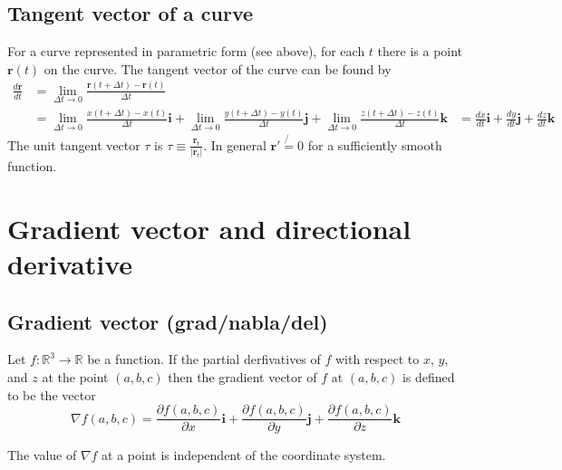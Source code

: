 \documentclass[12pt]{article}
\begin{document}
	\subsection{Tangent vector of a curve}
	For a curve represented in parametric form (see above), for each $t$ there is a point $\mathbf{r}(t)$ on the curve. The tangent
	vector of the curve can be found by
	\begin{align*}
		\frac{d\mathbf{r}}{dt}& = \lim_{\Delta t \to 0} \frac{\mathbf{r}(t+\Delta t) - \mathbf{r}(t)}{\Delta t} \\
						& = \lim_{\Delta t \to 0} \frac{x(t+\Delta t) - x(t)}{\Delta t} \mathbf{i} + 
							  \lim_{\Delta t \to 0} \frac{y(t+\Delta t) - y(t)}{\Delta t} \mathbf{j} + 
							  \lim_{\Delta t \to 0} \frac{z(t+\Delta t) - z(t)}{\Delta t} \mathbf{k}
						& = \frac{dx}{dt} \mathbf{i} + \frac{dy}{dt} \mathbf{j} + \frac{dz}{dt} \mathbf{k}
	\end{align*} 
	The unit tangent vector $\tau$ is $\tau \equiv \frac{\mathbf{r}_t}{|\mathbf{r}_t|}$. In general $\mathbf{r}' \not{=} 0$ for
	a sufficiently smooth function.
	
\section{Gradient vector and directional derivative}
	
	\subsection{Gradient vector (grad/nabla/del)}
	\begin{defn}
		Let $f:\mathbb{R}^3 \to \mathbb{R}$ be a function. If the partial derfivatives of $f$ with respect to $x$, $y$, and $z$
		at the point $(a,b,c)$ then the gradient vector of $f$ at $(a,b,c)$ is defined to be the vector
		\[
			\nabla f(a,b,c) = \frac{\partial f(a,b,c)}{\partial x}\mathbf{i} + 
								\frac{\partial f(a,b,c)}{\partial y}\mathbf{j} + 
								\frac{\partial f(a,b,c)}{\partial z}\mathbf{k}
		\]
	\end{defn}
	
	The value of $\nabla f$ at a point is independent of the coordinate system.
\end{document}

